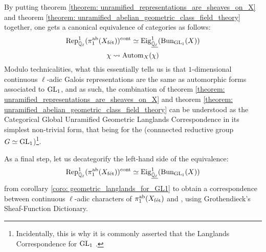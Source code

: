         \begin{corollary} \label{coro: geometric_langlands_for_GL1}
            By putting theorem \ref{theorem: unramified_representations_are_sheaves_on_X} and theorem \ref{theorem: unramified_abelian_geometric_class_field_theory} together, one gets a canonical equivalence of categories as follows:
                $$\mathrm{Rep}_{\bar{\mathbb{Q}}_{\ell}}^1(\pi_1^{\mathrm{ab}}(X_{\mathrm{f\acute{e}t}}))^{\mathrm{cont}} \simeq \mathrm{Eig}_{\underline{\bar{\mathbb{Q}}_{\ell}}}^1(\mathrm{Bun}_{\operatorname{GL}_1}(X))$$
                $$\chi \leadsto \mathrm{Autom}_X(\chi)$$
            Modulo technicalities, what this essentially tells us is that $1$-dimensional continuous $\ell$-adic Galois representations are the same as automorphic forms associated to $\operatorname{GL}_1$, and as such, the combination of theorem \ref{theorem: unramified_representations_are_sheaves_on_X} and theorem \ref{theorem: unramified_abelian_geometric_class_field_theory} can be understood as the Categorical Global Unramified Geometric Langlands Correspondence in its simplest non-trivial form, that being for the (connnected reductive group $G \simeq \operatorname{GL}_1$)\footnote{Incidentally, this is why it is commonly asserted that the Langlands Correspondence for $\operatorname{GL}_1$ .}. 
        \end{corollary}
        \begin{remark} \label{remark: unramified_abelian_geometric_class_field_theory_explanation}
            
        \end{remark}
    
        As a final step, let us decategorify the left-hand side of the equivalence:
            $$\mathrm{Rep}_{\bar{\mathbb{Q}}_{\ell}}^1(\pi_1^{\mathrm{ab}}(X_{\mathrm{f\acute{e}t}}))^{\mathrm{cont}} \simeq \mathrm{Eig}_{\underline{\bar{\mathbb{Q}}_{\ell}}}^1(\mathrm{Bun}_{\operatorname{GL}_1}(X))$$
        from corollary \ref{coro: geometric_langlands_for_GL1} to obtain a correspondence between continuous $\ell$-adic characters of $\pi_1^{\mathrm{ab}}(X_{\mathrm{f\acute{e}t}})$ and , using Grothendieck's Sheaf-Function Dictionary.
